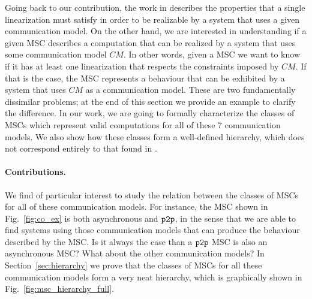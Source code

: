 

Going back to our contribution, the work in \cite{DBLP:journals/fac/ChevrouHQ16} describes the properties that a single linearization must satisfy in order to be realizable by a system that uses a given communication model. On the other hand, we are interested in understanding if a given MSC describes a computation that can be realized by a system that uses some communication model $CM$. In other words, given a MSC we want to know if it has at least one linearization that respects the constraints imposed by $CM$. If that is the case, the MSC represents a behaviour that can be exhibited by a system that uses $CM$ as a communication model. These are two fundamentally dissimilar problems; at the end of this section we provide an example to clarify the difference. In our work, we are going to formally characterize the classes of MSCs which represent valid computations for all of these 7 communication models. We also show how these classes form a well-defined hierarchy, which does not correspond entirely to that found in \cite{DBLP:journals/fac/ChevrouHQ16}.


\paragraph{Contributions.}

We find of particular interest to study the relation between the classes of MSCs for all of these communication models. For instance, the MSC shown in Fig.~\ref{fig:co_ex} is both asynchronous and $\mathtt{p2p}$, in the sense that we are able to find systems using those communication models that can produce the behaviour described by the MSC. Is it always the case than a $\mathtt{p2p}$ MSC is also an asynchronous MSC? What about the other communication models? In Section~\ref{sec:hierarchy} we prove that the classes of MSCs for all these communication models form a very neat hierarchy, which is graphically shown in Fig.~\ref{fig:msc_hierarchy_full}.


